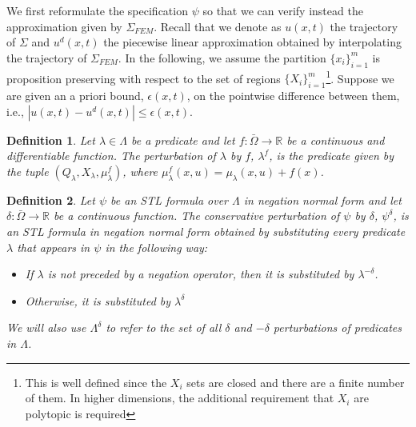 \documentclass[letterpaper, 10 pt, conference]{ieeeconf/ieeeconf}
\newtheorem{definition}{Definition}
\newcommand*{\R}{\mathbb{R}}
\begin{document}
We first reformulate the specification $\psi$ so that we can verify instead the
approximation given by $\Sigma_{FEM}$. Recall that we denote as $u(x,t)$ the
trajectory of $\Sigma$ and $u^d(x, t)$ the piecewise linear approximation
obtained by interpolating the trajectory of $\Sigma_{FEM}$. In the following, we
assume the partition $\{x_i\}_{i=1}^m$ is proposition preserving with respect 
to the set of
regions $\{X_i\}_{i = 1}^{m}$\footnote{This is well defined since the $X_i$ sets are
closed and there are a finite number of them. In higher dimensions, the
additional requirement that $X_i$ are polytopic is required}. Suppose we are given
an a priori bound, $\epsilon(x, t)$, on the pointwise difference between them, i.e., 
$|u(x, t) - u^d(x, t)| \leq \epsilon(x, t)$.

\begin{definition}
\label{def:m_perturbation}
    Let $\lambda \in \Lambda$ be a predicate
    and let $f : \bar\Omega \to \R$ be a continuous and differentiable function. The perturbation of
    $\lambda$ by $f$, $\lambda^f$, is the predicate given by the tuple
    $(Q_\lambda, X_\lambda,
    \mu^f_\lambda)$, where $\mu^f_\lambda(x, u) = \mu_\lambda(x, u) + f(x)$.
\end{definition}

\begin{definition}
\label{def:delta_perturbation}
    Let $\psi$ be an STL formula over $\Lambda$ in negation normal form 
    and let $\delta : \bar\Omega \to \R$ be a continuous function. The
    conservative perturbation of $\psi$ by $\delta$, $\psi^\delta$, is an STL
    formula in negation normal form obtained by substituting every predicate
    $\lambda$ that appears in $\psi$ in the following way:

    \begin{itemize}
        \item If $\lambda$ is not preceded by a negation operator, then it is
            substituted by $\lambda^{-\delta}$.
        \item Otherwise, it is substituted by $\lambda^{\delta}$
    \end{itemize}

    We will also use $\Lambda^{\delta}$ to refer to the set of all $\delta$ and
    $-\delta$
    perturbations of predicates in $\Lambda$.
\end{definition}
\end{document}
